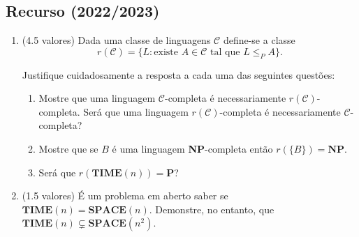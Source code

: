 \documentclass[a4paper,12pt]{article}
\begin{document}
\vspace{1.0cm}
\subsection*{Recurso (2022/2023)}
\begin{enumerate}[label=\alph*)]
  \item (4.5 valores) Dada uma classe de linguagens \(\mathcal{C}\) define-se a classe  
  \[ r(\mathcal{C}) = \{L : \text{existe } A \in \mathcal{C} \text{ tal que } L \leq_P A\}. \]  
  
  Justifique cuidadosamente a resposta a cada uma das seguintes questões:  
  
  \begin{enumerate}[label=(\roman*)]
      \item Mostre que uma linguagem \(\mathcal{C}\)-completa é necessariamente \(r(\mathcal{C})\)-completa.  
      Será que uma linguagem \(r(\mathcal{C})\)-completa é necessariamente \(\mathcal{C}\)-completa?  
      
      \item Mostre que se \(B\) é uma linguagem \textbf{NP}-completa então \(r(\{B\}) = \textbf{NP}\).  
      
      \item Será que \(r(\textbf{TIME}(n)) = \textbf{P}\)?  
  \end{enumerate}
  
  \item (1.5 valores) É um problema em aberto saber se \(\textbf{TIME}(n) = \textbf{SPACE}(n)\). Demonstre, no entanto, que \(\textbf{TIME}(n) \subsetneq \textbf{SPACE}(n^2)\).
\end{enumerate}
\end{document}
